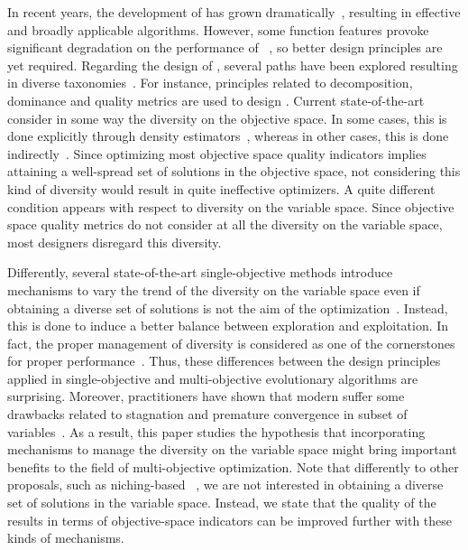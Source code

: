 %
In recent years, the development of \MOEAS{} has grown dramatically~\cite{van1998multiobjective, coello2007mop}, resulting 
in effective and broadly applicable algorithms.
%
However, some function features provoke significant degradation on the performance of \MOEAS{}~\cite{huband2006review}, 
so better design principles are yet required.
%
Regarding the design of \MOEAS{}, several paths have been explored resulting in diverse taxonomies~\cite{trivedi2016survey}.
%
For instance, principles related to decomposition, dominance and quality metrics are used
to design \MOEAS{}.
%
Current state-of-the-art \MOEAS{} consider in some way the diversity on the objective space.
%
In some cases, this is done explicitly through density estimators~\cite{beume:07}, %
whereas in other cases,
this is done indirectly~\cite{zhang2007moea}. 
%
Since optimizing most objective space quality indicators implies attaining a well-spread set of solutions in the
objective space, not considering this kind of diversity would result in quite ineffective optimizers.
%
A quite different condition appears with respect to diversity on the variable space.
%
Since objective space quality metrics do not consider at all the diversity on the variable space,
most \MOEAS{} designers disregard this diversity.

Differently, %
several state-of-the-art single-objective methods introduce mechanisms to vary the trend of the 
diversity on the variable space even if obtaining a diverse
set of solutions is not the aim of the optimization~\cite{Joel:Crepinsek}.
%
Instead, this is done to induce a better balance between exploration and exploitation.
%
In fact, the proper management of diversity is considered as one of the cornerstones for proper performance~\cite{Herrera-Poyatos:17}.
%
Thus, these differences between the design principles applied in single-objective and multi-objective evolutionary 
algorithms are surprising.
%
Moreover, practitioners have shown that modern \MOEAS{} suffer some drawbacks related to stagnation and premature 
convergence in subset of variables~\cite{ishibuchi2006comparison, castillo2017multi, buche2003self, lu2002dynamic}.
%
As a result, this paper studies the hypothesis that incorporating mechanisms to manage the diversity on the variable space 
might bring important benefits to the field of multi-objective optimization.
%
Note that differently to other proposals, such as niching-based \MOEAS{}~\cite{mahfoud1995niching, srinivas1994muiltiobjective}, we are not interested in obtaining
a diverse set of solutions in the variable space.
%
Instead, we state that the quality of the results in terms of objective-space indicators can be improved further with these
kinds of mechanisms.

